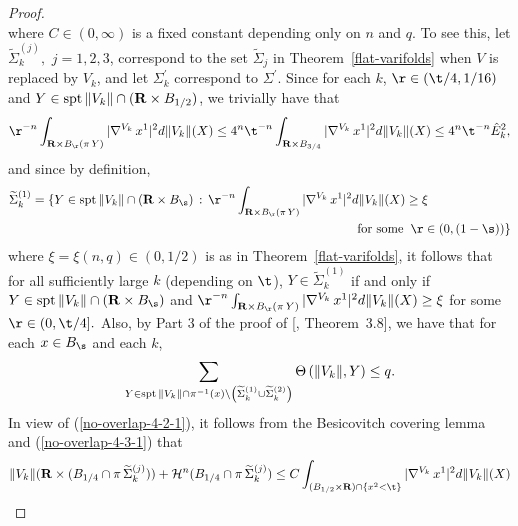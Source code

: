\documentclass[a4paper,11pt]{amsart}
\begin{document}
\begin{proof}
\begin{equation}
\end{equation}
where $C \in (0, \infty)$ is a fixed constant depending only on $n$ and $q$. To see this, let $\widetilde{\Sigma}_{k}^{(j)},$ $j=1, 2, 3$, correspond to the set $\widetilde{\Sigma}_{j}$ in Theorem~\ref{flat-varifolds} when $V$ is replaced by $V_{k}$, and let $\Sigma_{k}^{\prime}$ correspond to $\Sigma^{\prime}.$ Since for
each $k$, $\r \in (\t/4, 1/16)$ and $Y \in {\rm spt} \, \|V_{k}\| \cap 
({\mathbf R} \times B_{1/2})$, we trivially have that 
\begin{equation}
\r^{-n}\int_{{\mathbf R} \times B_{\r}(\pi \, Y)} |\nabla^{V_{k}} \, x^{1}|^{2} d\|V_{k}\|(X) \leq 4^{n}\t^{-n} \int_{{\mathbf R} \times B_{3/4}} |\nabla^{V_{k}} \, x^{1}|^{2} d\|V_{k}\|(X) \leq 4^{n}\t^{-n}{\hat E}_{k}^{2},
\end{equation}
and since by definition,  
\begin{eqnarray*}
{\widetilde \Sigma}_{k}^{(1)} = \{Y \in {\rm spt} \, \|V_{k}\| \cap ({\mathbf R} \times B_{\s}) \, : \, 
\r^{-n}\int_{{\mathbf R} \times B_{\r}(\pi \, Y)} |\nabla^{V_{k}} \, x^{1}|^{2} d\|V_{k}\|(X) \geq \xi&&\\
&&\hspace{-1in} \;\; \mbox{for some} \;\;
\r \in (0, (1-\s))\}
\end{eqnarray*}
where $\xi = \xi(n, q) \in (0, 1/2)$ is as in Theorem~\ref{flat-varifolds}, it follows that for all sufficiently large $k$ (depending on $\t$), 
$Y \in \widetilde{\Sigma}_{k}^{(1)}$ if and only if $Y \in {\rm spt} \, \|V_{k}\| \cap ({\mathbf R} \times B_{\s})$ and $\r^{-n}\int_{{\mathbf R} \times B_{\r}(\pi \, Y)} |\nabla^{V_{k}} \, x^{1}|^{2} d\|V_{k}\|(X) \geq \xi$ for some 
$\r \in (0, \t/4].$ Also, by Part 3 of the proof of [\cite{A}, Theorem~3.8], 
we have that for each $x \in B_{\s}$ and each $k$, 
\begin{equation}\label{no-overlap-4-3-1}
\sum_{Y \in {\rm spt} \, \|V_{k}\| \cap \pi^{-1}(x) \setminus \left({\widetilde \Sigma}_{k}^{(1)} \cup {\widetilde \Sigma}_{k}^{(2)}\right)}\Theta\left(\|V_{k}\|, Y\right) \leq q. 
\end{equation}
In view of (\ref{no-overlap-4-2-1}), it follows from the Besicovitch covering lemma and (\ref{no-overlap-4-3-1}) that
\begin{equation*}
\|V_{k}\|({\mathbf R} \times (B_{1/4} \cap \pi \, \widetilde{\Sigma}_{k}^{(j)})) + {\mathcal H}^{n}(B_{1/4} \cap  \pi \, \widetilde{\Sigma}_{k}^{(j)}) 
\leq C \int_{(B_{1/2} \times {\mathbf R}) \cap \{x^{2} < \t\}} |\nabla^{V_{k}} \, x^{1}|^{2} d\|V_{k}\|(X)

\end{equation*}
\end{proof}
\end{document}

